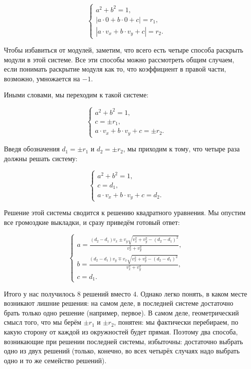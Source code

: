 $$ \begin{cases}
a^2 + b^2 = 1, \\
| a \cdot 0 + b \cdot 0 + c | = r_1, \\
| a \cdot v_x + b \cdot v_y + c | = r_2.
\end{cases} $$

Чтобы избавиться от модулей, заметим, что всего есть четыре способа раскрыть модули в этой системе. Все эти способы можно рассмотреть общим случаем, если понимать раскрытие модуля как то, что коэффициент в правой части, возможно, умножается на $-1$.

Иными словами, мы переходим к такой системе:

$$ \begin{cases}
a^2 + b^2 = 1, \\
c = \pm r_1, \\
a \cdot v_x + b \cdot v_y + c = \pm r_2.
\end{cases} $$

Введя обозначения $d_1 = \pm r_1$ и $d_2 = \pm r_2$, мы приходим к тому, что четыре раза должны решать систему:

$$ \begin{cases}
a^2 + b^2 = 1, \\
c = d_1, \\
a \cdot v_x + b \cdot v_y + c = d_2.
\end{cases} $$

Решение этой системы сводится к решению квадратного уравнения. Мы опустим все громоздкие выкладки, и сразу приведём готовый ответ:

$$ \begin{cases}
a = \frac{ (d_2-d_1)v_x \pm v_y \sqrt{ v_x^2 + v_y^2 - (d_2-d_1)^2 } }{ v_x^2 + v_y^2 }, \\
b = \frac{ (d_2-d_1)v_y \mp v_x \sqrt{ v_x^2 + v_y^2 - (d_2-d_1)^2 } }{ v_x^2 + v_y^2 }, \\
c = d_1.
\end{cases} $$

Итого у нас получилось $8$ решений вместо $4$. Однако легко понять, в каком месте возникают лишние решения: на самом деле, в последней системе достаточно брать только одно решение (например, первое). В самом деле, геометрический смысл того, что мы берём $\pm r_1$ и $\pm r_2$, понятен: мы фактически перебираем, по какую сторону от каждой из окружностей будет прямая. Поэтому два способа, возникающие при решении последней системы, избыточны: достаточно выбрать одно из двух решений (только, конечно, во всех четырёх случаях надо выбрать одно и то же семейство решений).

